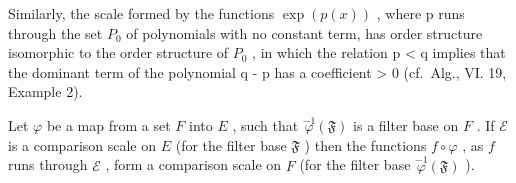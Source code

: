 Similarly, the scale formed by the functions \(\exp(p(x))\) , where p runs through the set \(P_{0}\) of polynomials with no constant term, has order structure isomorphic to the order structure of \(P_{0}\) , in which the relation p \textless{} q implies that the dominant term of the polynomial q - p has a coefficient \textgreater{} 0 (cf.~Alg., VI. 19, Example 2).

Let \(\varphi\) be a map from a set \(F\) into \(E\) , such that \(\overset{-1}{\varphi}(\mathfrak{F})\) is a filter base on \(F\) . If \(\mathcal{E}\) is a comparison scale on \(E\) (for the filter base \(\mathfrak{F}\) ) then the functions \(f \circ \varphi\) , as \(f\) runs through \(\mathcal{E}\) , form a comparison scale on \(F\) (for the filter base \(\overset{-1}{\varphi}(\mathfrak{F})\) ).

